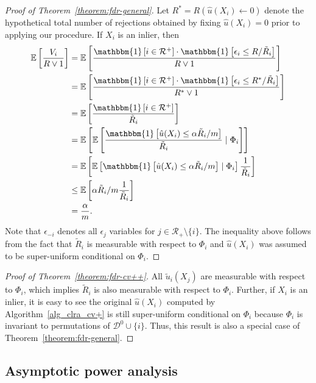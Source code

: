 \documentclass[11pt]{article}
\newcommand{\E}[1]{\mathbb{E}\left[#1\right]}
\newcommand{\I}[1]{\mathbbm{1}\left[#1\right]}
\begin{document}
\begin{proof}[Proof of Theorem~\ref{theorem:fdr-general}]
Let $R^*=R(\hat{u}(X_i) \leftarrow 0)$ denote the hypothetical total number of rejections obtained by fixing $\hat{u}(X_i)=0$ prior to applying our procedure.
If $X_i$ is an inlier, then
\begin{align*}
    \E{\frac{V_i}{R \lor 1} }
    & = \E{ \frac{\I{i \in \mathcal{R}^+} \cdot \I{\epsilon_i \leq R/\tilde{R}_i}}{R \lor 1} } \\
    & = \E{ \frac{\I{i \in \mathcal{R}^+} \cdot \I{\epsilon_i \leq R^*/\tilde{R}_i}}{R^* \lor 1} }\\
     & = \E{ \frac{\I{i \in \mathcal{R}^+}}{\tilde{R}_i} }\\
     & = \E{ \E{ \frac{ \I{ \hat{u}(X_i) \leq \alpha\tilde{R}_i / m }}{\tilde{R}_i} \mid \Phi_i } }  \\
     & = \E{ \E{ \I{ \hat{u}(X_i) \leq \alpha\tilde{R}_i / m } \mid \Phi_i } \frac{1}{\tilde{R}_i} }  \\
     & \leq \E{ \alpha\tilde{R}_i / m \frac{1}{\tilde{R}_i} }   \\
     & = \frac{\alpha}{m}.
\end{align*}
Note that $\epsilon_{-i}$ denotes all $\epsilon_j$ variables for $j \in \mathcal{R}_+ \setminus \{i\}$.
The inequality above follows from the fact that $\tilde{R}_i$ is measurable with respect to $\Phi_i$ and $\hat{u}(X_i)$ was assumed to be super-uniform conditional on $\Phi_i$.
\end{proof}

\begin{proof}[Proof of Theorem~\ref{theorem:fdr-cv++}]
All $\tilde{u}_{i}(X_j)$ are measurable with respect to $\Phi_i$, which implies $\tilde{R}_i$ is also measurable with respect to $\Phi_i$.
Further, if $X_i$ is an inlier, it is easy to see the original $\hat{u}(X_i)$ computed by Algorithm~\ref{alg_clra_cv+} is still super-uniform conditional on $\Phi_i$ because $\Phi_i$ is invariant to permutations of $\mathcal{D}^0 \cup \{i\}$.
Thus, this result is also a special case of Theorem~\ref{theorem:fdr-general}.
\end{proof}

\subsection{Asymptotic power analysis}
\end{document}
